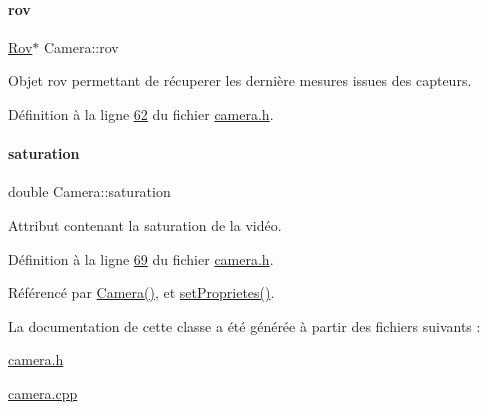 \paragraph{\texorpdfstring{rov}{rov}}
{\footnotesize\ttfamily \hyperlink{class_rov}{Rov}$\ast$ Camera\+::rov\hspace{0.3cm}{\ttfamily [private]}}



Objet rov permettant de récuperer les dernière mesures issues des capteurs. 



Définition à la ligne \hyperlink{camera_8h_source_l00062}{62} du fichier \hyperlink{camera_8h_source}{camera.\+h}.

\mbox{\label{class_camera_afd46d6d2451ee33b68dbc74713f2687c}} 
\paragraph{\texorpdfstring{saturation}{saturation}}
{\footnotesize\ttfamily double Camera\+::saturation\hspace{0.3cm}{\ttfamily [private]}}



Attribut contenant la saturation de la vidéo. 



Définition à la ligne \hyperlink{camera_8h_source_l00069}{69} du fichier \hyperlink{camera_8h_source}{camera.\+h}.



Référencé par \hyperlink{camera_8cpp_source_l00012}{Camera()}, et \hyperlink{camera_8cpp_source_l00108}{set\+Proprietes()}.



La documentation de cette classe a été générée à partir des fichiers suivants \+:\begin{DoxyCompactItemize}
\item 
\hyperlink{camera_8h}{camera.\+h}\item 
\hyperlink{camera_8cpp}{camera.\+cpp}\end{DoxyCompactItemize}
